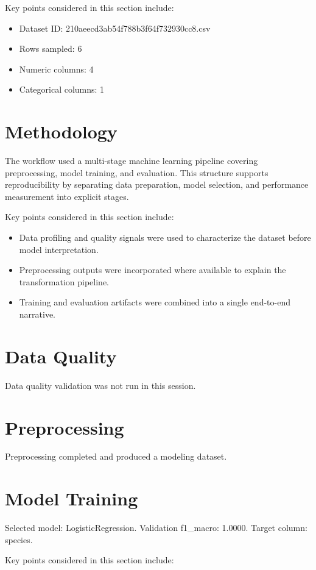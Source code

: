 \documentclass[11pt]{article}
\begin{document}
Key points considered in this section include:

\begin{itemize}
\item Dataset ID: 210aeecd3ab54f788b3f64f732930cc8.csv
\item Rows sampled: 6
\item Numeric columns: 4
\item Categorical columns: 1
\end{itemize}


\section{Methodology}
The workflow used a multi-stage machine learning pipeline covering preprocessing, model training, and evaluation. This structure supports reproducibility by separating data preparation, model selection, and performance measurement into explicit stages.

Key points considered in this section include:

\begin{itemize}
\item Data profiling and quality signals were used to characterize the dataset before model interpretation.
\item Preprocessing outputs were incorporated where available to explain the transformation pipeline.
\item Training and evaluation artifacts were combined into a single end-to-end narrative.
\end{itemize}


\section{Data Quality}
Data quality validation was not run in this session.

\section{Preprocessing}
Preprocessing completed and produced a modeling dataset.

\section{Model Training}
Selected model: LogisticRegression. Validation f1\_macro: 1.0000. Target column: species.

Key points considered in this section include:
\end{document}
